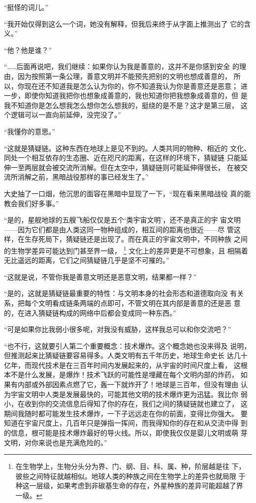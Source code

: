 “挺怪的词儿。”

“我开始仅得到这么一个词，她没有解释，但我后来终于从字面上推测出了
它的含义。”

“他？他是谁？”

“……后面再说吧，我们继续：如果你认为我是善意的，这并不是你感到安全
的理由，因为按照第一条公理，善意文明并不能预先把别的文明也想成善意的，
所以，你现在还不知道我是怎么认为你的，你不知道我认为你是善意还是恶意；
进一步，即使你知道我把你也想象成善意的，我也知道你把我想象成善意的，但
是我不知道你是怎么想我怎么想你怎么想我的，挺绕的是不是？这才是第三层，
这个逻辑可以一直向前延伸，没完没了。”

“我懂你的意思。”

“这就是猜疑链。这种东西在地球上是见不到的。人类共同的物种、相近的
文化、同处一个相互依存的生态圈、近在咫尺的距离，在这样的环境下，猜疑链
只能延伸一至两层就会被交流所消解。但在太空中，猜疑链则可能延伸得很长，
在被交流所消解之前，黑暗战役那样的事已经发生了。”

大史抽了一口烟，他沉思的面容在黑暗中显现了一下，“现在看来黑暗战役
真的能教会我们好多事。”

“是的，星舰地球的五艘飞船仅仅是五个‘类宇宙文明’，还不是真正的宇
宙文明——因为它们都是由人类这同一物种组成的，相互间的距离也很近——尽
管这样，在生存死局下，猜疑链还是出现了。而在真正的宇宙文明中，不同种族
之间的生物学差异可能达到门甚至界一级，
\footnote{在生物学上，生物分头分为界、门、纲、目、科、属、种，阶层越是往
下，彼些之间特征就越相似。地球人类的种族之间在生物学上的差异也就局限
于种这一层级，如果考虑到非碳基生命的存在，外星种族的差异可能超越了界
一级。}
文化上的差异更是不可想象，且
相隔着无比遥远的距离，它们之间猜疑链几乎是坚不可摧的。”

“这就是说，不管你我是善意文明还是恶意文明，结果都一样？”

“是的，这就是猜疑链最重要的特性：与文明本身的社会形态和道德取向没
有关系，把每个文明看成链条两端的点即可，不管文明在其内部是善意的还是恶
意的，在进入猜疑链构成的网络中后都会变成同一种东西。”

“可是如果你比我弱小很多呢，对我没有威胁，这样我总可以和你交流吧？”

“也不行，这就要引人第二个重要概念：技术爆炸。这个概念她也没来得及
说明，但推测起来比猜疑链要容易得多。人类文明有五千年历史，地球生命史长
达几十亿年，而现代技术是在三百年时间内发展起来的，从宇宙的时间尺度上看，
这根本不是什么发展，是爆炸！技术飞跃的可能性是埋藏在每个文明内部的炸药，
如果有内部或外部因素点燃了它，轰一下就炸开了！地球是三百年，但没有理由
认为宇宙文明中人类是发展最快的，可能其他文明的技术爆炸更为迅猛。我比你
弱小，在收到你的交流信息后得知了你的存在，我们之间的猜疑链就也建立了，
这期间我随时都可能发生技术爆炸，一下子远远走在你的前面，变得比你强大。
要知道在宇宙尺度上，几百年只是弹指一挥间，而我得知你的存在和从交流中得
到的信息，根可能是技术爆炸最好的导火线。所以，即使我仅仅是婴儿文明或萌
芽文明，对你来说也是充满危险的。”

